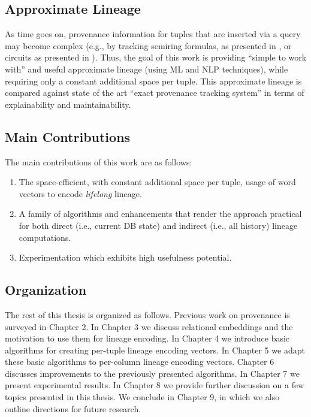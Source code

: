 \subsection*{Approximate Lineage}
As time goes on, provenance information for tuples that are inserted via a query may become complex (e.g., by tracking semiring formulas, as presented in \cite{green2007provenance}, or circuits as presented  in \cite{Deutch2014, Senellart2017}). Thus, the goal of this work is providing ``simple to work with'' and useful approximate lineage (using ML and NLP techniques), while requiring only a constant additional space per tuple. This approximate lineage is compared against state of the art ``exact provenance tracking system'' in terms of explainability and maintainability.\\


\subsection*{Main Contributions}
\par The main contributions of this work are as follows:
\begin{enumerate}
    \item The space-efficient, with constant additional space per tuple, usage of word vectors to encode \textit{lifelong} lineage.
    \item A family of algorithms and enhancements that render the approach practical for both direct (i.e., current DB state) and indirect (i.e., all history) lineage computations.
    \item Experimentation which exhibits high usefulness potential.
\end{enumerate}


\subsection*{Organization}
The rest of this thesis is organized as follows.
Previous work on provenance is surveyed in Chapter 2.
In Chapter 3 we discuss relational embeddings and the motivation to use them for lineage encoding.
In Chapter 4 we introduce basic algorithms for creating per-tuple lineage encoding vectors.
In Chapter 5 we adapt these basic algorithms to per-column lineage encoding vectors.
Chapter 6 discusses improvements to the previously presented algorithms.
In Chapter 7 we present experimental results.
In Chapter 8 we provide further discussion on a few topics presented in this thesis.
We conclude in Chapter 9, in which we also outline directions for future research.

